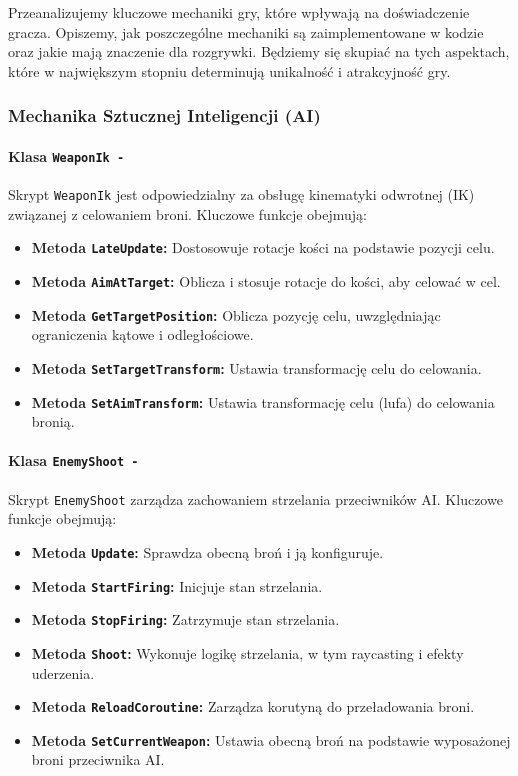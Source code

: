 Przeanalizujemy kluczowe mechaniki gry, które wpływają na doświadczenie gracza. Opiszemy, jak poszczególne mechaniki są zaimplementowane w kodzie oraz jakie mają znaczenie dla rozgrywki. Będziemy się skupiać na tych aspektach, które w największym stopniu determinują unikalność i atrakcyjność gry.

\subsubsection{Mechanika Sztucznej Inteligencji (AI)}

\paragraph{Klasa \texttt{WeaponIk -}}
Skrypt \texttt{WeaponIk} jest odpowiedzialny za obsługę kinematyki odwrotnej (IK) związanej z celowaniem broni. Kluczowe funkcje obejmują:
\begin{itemize}
\item \textbf{Metoda \texttt{LateUpdate}:} Dostosowuje rotacje kości na podstawie pozycji celu.
\item \textbf{Metoda \texttt{AimAtTarget}:} Oblicza i stosuje rotacje do kości, aby celować w cel.
\item \textbf{Metoda \texttt{GetTargetPosition}:} Oblicza pozycję celu, uwzględniając ograniczenia kątowe i odległościowe.
\item \textbf{Metoda \texttt{SetTargetTransform}:} Ustawia transformację celu do celowania.
\item \textbf{Metoda \texttt{SetAimTransform}:} Ustawia transformację celu (lufa) do celowania bronią.
\end{itemize}

\paragraph{Klasa \texttt{EnemyShoot -}}
Skrypt \texttt{EnemyShoot} zarządza zachowaniem strzelania przeciwników AI. Kluczowe funkcje obejmują:
\begin{itemize}
\item \textbf{Metoda \texttt{Update}:} Sprawdza obecną broń i ją konfiguruje.
\item \textbf{Metoda \texttt{StartFiring}:} Inicjuje stan strzelania.
\item \textbf{Metoda \texttt{StopFiring}:} Zatrzymuje stan strzelania.
\item \textbf{Metoda \texttt{Shoot}:} Wykonuje logikę strzelania, w tym raycasting i efekty uderzenia.
\item \textbf{Metoda \texttt{ReloadCoroutine}:} Zarządza korutyną do przeładowania broni.
\item \textbf{Metoda \texttt{SetCurrentWeapon}:} Ustawia obecną broń na podstawie wyposażonej broni przeciwnika AI.
\end{itemize}

